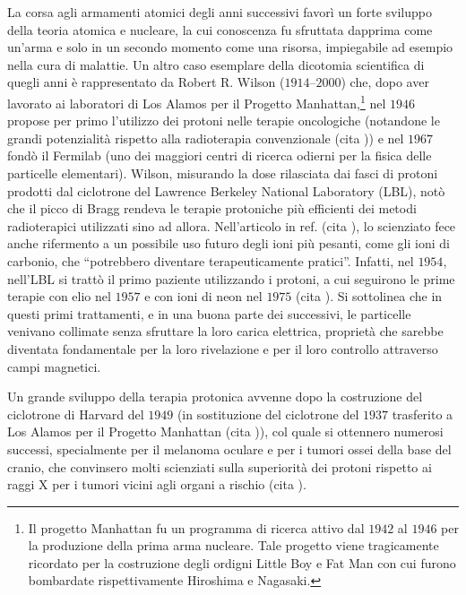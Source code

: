 \documentclass[12pt,a4paper,twoside]{report}
\begin{document}
	La corsa agli armamenti atomici degli anni successivi favorì un forte sviluppo della teoria atomica e nucleare, la cui conoscenza fu sfruttata dapprima come un'arma e solo in un secondo momento come una risorsa, impiegabile ad esempio nella cura di malattie. Un altro caso esemplare della dicotomia scientifica di quegli anni è rappresentato da Robert R. Wilson ($1914$--$2000$) che, dopo aver lavorato ai laboratori di Los Alamos per il Progetto Manhattan,\footnote{Il progetto Manhattan fu un programma di ricerca attivo dal $1942$ al $1946$ per la produzione della prima arma nucleare. Tale progetto viene tragicamente ricordato per la costruzione degli ordigni Little Boy e Fat Man con cui furono bombardate rispettivamente Hiroshima e Nagasaki.} nel $1946$ propose per primo l'utilizzo dei protoni nelle terapie oncologiche (notandone le grandi potenzialità rispetto alla radioterapia convenzionale (cita
	)) e nel $1967$ fondò il Fermilab (uno dei maggiori centri di ricerca odierni per la fisica delle particelle elementari). Wilson, misurando la dose rilasciata dai fasci di protoni prodotti dal ciclotrone del Lawrence Berkeley National Laboratory (LBL), notò che il picco di Bragg rendeva le terapie protoniche più efficienti dei metodi radioterapici utilizzati sino ad allora. Nell'articolo in ref. (cita
	), lo scienziato fece anche rifermento a un possibile uso futuro degli ioni più pesanti, come gli ioni di carbonio, che ``potrebbero diventare terapeuticamente pratici''. Infatti, nel $1954$, nell'LBL si trattò il primo paziente utilizzando i protoni, a cui seguirono le prime terapie con elio nel $1957$ e con ioni di neon nel $1975$ (cita
	). Si sottolinea che in questi primi trattamenti, e in una buona parte dei successivi, le particelle venivano collimate senza sfruttare la loro carica elettrica, proprietà che sarebbe diventata fondamentale per la loro rivelazione e per il loro controllo attraverso campi magnetici.
	
	Un grande sviluppo della terapia protonica avvenne dopo la costruzione del ciclotrone di Harvard del $1949$ (in sostituzione del ciclotrone del $1937$ trasferito a Los Alamos per il Progetto Manhattan (cita
	)), col quale si ottennero numerosi successi, specialmente per il melanoma oculare e per i tumori ossei della base del cranio, che convinsero molti scienziati sulla superiorità dei protoni rispetto ai raggi X per i tumori vicini agli organi a rischio (cita
	).
	
\end{document}
